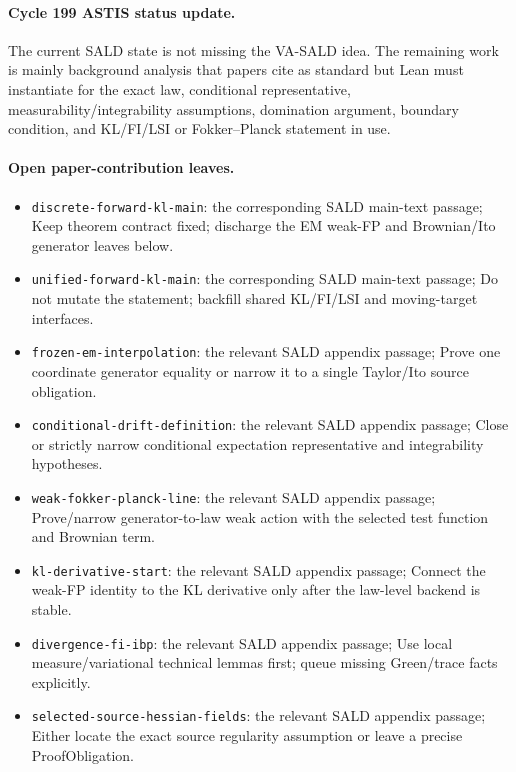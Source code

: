 \paragraph{Cycle 199 ASTIS status update.}
The current SALD state is not missing the VA-SALD idea.  The remaining work is mainly background analysis that papers cite as standard but Lean must instantiate for the exact law, conditional representative, measurability/integrability assumptions, domination argument, boundary condition, and KL/FI/LSI or Fokker--Planck statement in use.

\paragraph{Open paper-contribution leaves.}
\begin{itemize}
\item \texttt{discrete-forward-kl-main}: the corresponding SALD main-text passage; Keep theorem contract fixed; discharge the EM weak-FP and Brownian/Ito generator leaves below.
\item \texttt{unified-forward-kl-main}: the corresponding SALD main-text passage; Do not mutate the statement; backfill shared KL/FI/LSI and moving-target interfaces.
\item \texttt{frozen-em-interpolation}: the relevant SALD appendix passage; Prove one coordinate generator equality or narrow it to a single Taylor/Ito source obligation.
\item \texttt{conditional-drift-definition}: the relevant SALD appendix passage; Close or strictly narrow conditional expectation representative and integrability hypotheses.
\item \texttt{weak-fokker-planck-line}: the relevant SALD appendix passage; Prove/narrow generator-to-law weak action with the selected test function and Brownian term.
\item \texttt{kl-derivative-start}: the relevant SALD appendix passage; Connect the weak-FP identity to the KL derivative only after the law-level backend is stable.
\item \texttt{divergence-fi-ibp}: the relevant SALD appendix passage; Use local measure/variational technical lemmas first; queue missing Green/trace facts explicitly.
\item \texttt{selected-source-hessian-fields}: the relevant SALD appendix passage; Either locate the exact source regularity assumption or leave a precise ProofObligation.
\end{itemize}

